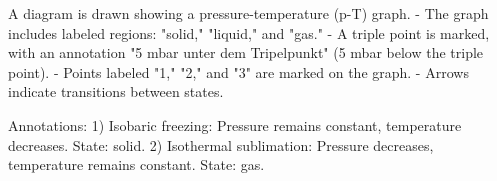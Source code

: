 A diagram is drawn showing a pressure-temperature (p-T) graph.  
- The graph includes labeled regions: "solid," "liquid," and "gas."  
- A triple point is marked, with an annotation "5 mbar unter dem Tripelpunkt" (5 mbar below the triple point).  
- Points labeled "1," "2," and "3" are marked on the graph.  
- Arrows indicate transitions between states.  

Annotations:  
1) Isobaric freezing: Pressure remains constant, temperature decreases. State: solid.  
2) Isothermal sublimation: Pressure decreases, temperature remains constant. State: gas.